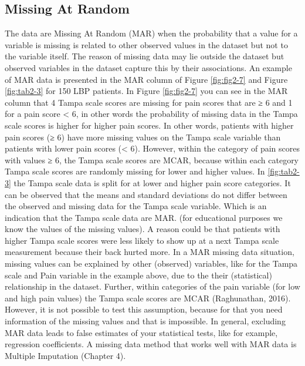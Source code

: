 \documentclass[]{book}
\theoremstyle{definition}
\theoremstyle{definition}
\theoremstyle{definition}
\theoremstyle{remark}
\begin{document}
\subsection{Missing At Random}\label{missing-at-random}

The data are Missing At Random (MAR) when the probability that a value
for a variable is missing is related to other observed values in the
dataset but not to the variable itself. The reason of missing data may
lie outside the dataset but observed variables in the dataset capture
this by their associations. An example of MAR data is presented in the
MAR column of Figure \ref{fig:fig2-7} and Figure \ref{fig:tab2-3} for
150 LBP patients. In Figure \ref{fig:fig2-7} you can see in the MAR
column that 4 Tampa scale scores are missing for pain scores that are ≥
6 and 1 for a pain score \textless{} 6, in other words the probability
of missing data in the Tampa scale scores is higher for higher pain
scores. In other words, patients with higher pain scores (≥ 6) have more
missing values on the Tampa scale variable than patients with lower pain
scores (\textless{} 6). However, within the category of pain scores with
values ≥ 6, the Tampa scale scores are MCAR, because within each
category Tampa scale scores are randomly missing for lower and higher
values. In \ref{fig:tab2-3} the Tampa scale data is split for at lower
and higher pain score categories. It can be observed that the means and
standard deviations do not differ between the observed and missing data
for the Tampa scale variable. Which is an indication that the Tampa
scale data are MAR. (for educational purposes we know the values of the
missing values). A reason could be that patients with higher Tampa scale
scores were less likely to show up at a next Tampa scale measurement
because their back hurted more. In a MAR missing data situation, missing
values can be explained by other (observed) variables, like for the
Tampa scale and Pain variable in the example above, due to the their
(statistical) relationship in the dataset. Further, within categories of
the pain variable (for low and high pain values) the Tampa scale scores
are MCAR (Raghunathan, 2016). However, it is not possible to test this
assumption, because for that you need information of the missing values
and that is impossible. In general, excluding MAR data leads to false
estimates of your statistical tests, like for example, regression
coefficients. A missing data method that works well with MAR data is
Multiple Imputation (Chapter 4).
\end{document}
